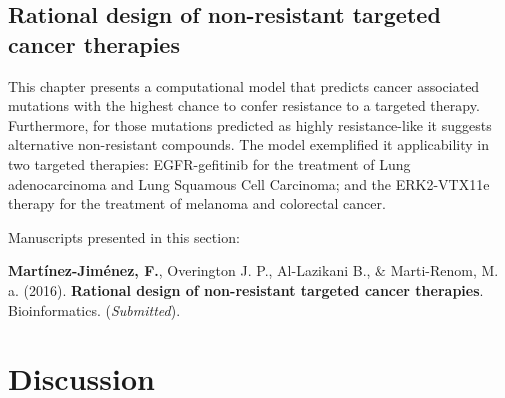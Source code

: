 \documentclass[11pt, b5paper,twoside]{tesi_upf}
\begin{document}
\clearpage
 
 
\subsection{Rational design of non-resistant targeted cancer therapies}\label{blending}

\par  This chapter presents a computational model that predicts cancer associated mutations with the highest chance to confer resistance to a targeted therapy. Furthermore, for those mutations predicted as highly resistance-like it suggests alternative non-resistant compounds. The model exemplified it applicability in two targeted therapies: EGFR-gefitinib for the treatment of Lung adenocarcinoma and Lung Squamous Cell Carcinoma; and the ERK2-VTX11e therapy for the treatment of melanoma and colorectal cancer.  

Manuscripts presented in this section:
\vspace*{10mm}
 \begin{tcolorbox}

\textbf{Martínez-Jiménez, F.}, Overington J. P., Al-Lazikani B., $\&$ Marti-Renom, M. a. (2016). \textbf{Rational design of non-resistant targeted cancer therapies}. Bioinformatics.  (\textit{Submitted}). 
\hfill
\vspace*{7mm}
\end{tcolorbox}




\clearpage
\section{Discussion}\label{discussion}
\end{document}
